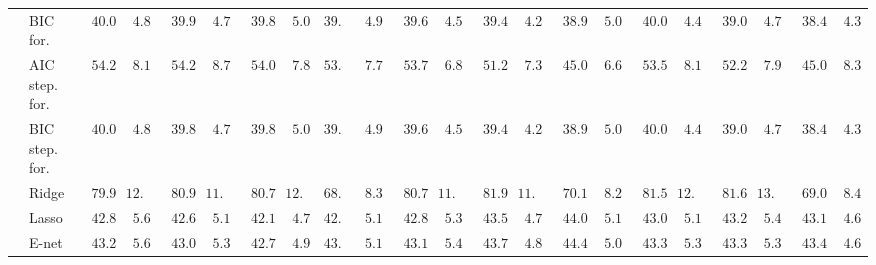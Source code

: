 \begin{tabular}{llllllllllllllllllllll}
	& BIC for.  & $\phantom{0}40.046$ & $\phantom{0}4.891$ & $\phantom{0}39.903$ & $\phantom{0}4.745$ & $\phantom{0}39.851$ & $\phantom{0}5.058$ & $39.678$ & $\phantom{0}4.918$ & $\phantom{0}39.620$ & $\phantom{0}4.530$ & $\phantom{0}39.457$ & $\phantom{0}4.230$ & $\phantom{0}38.935$ & $\phantom{0}5.059$ & $\phantom{0}40.050$ & $\phantom{0}4.482$ & $\phantom{0}39.016$ & $\phantom{0}4.798$ & $\phantom{0}38.473$ & $\phantom{0}4.378$ \\
	& AIC step. for.  & $\phantom{0}54.259$ & $\phantom{0}8.172$ & $\phantom{0}54.213$ & $\phantom{0}8.766$ & $\phantom{0}54.067$ & $\phantom{0}7.897$ & $53.360$ & $\phantom{0}7.769$ & $\phantom{0}53.740$ & $\phantom{0}6.857$ & $\phantom{0}51.263$ & $\phantom{0}7.309$ & $\phantom{0}45.025$ & $\phantom{0}6.651$ & $\phantom{0}53.545$ & $\phantom{0}8.129$ & $\phantom{0}52.284$ & $\phantom{0}7.974$ & $\phantom{0}45.033$ & $\phantom{0}8.324$ \\
	& BIC step. for.  & $\phantom{0}40.004$ & $\phantom{0}4.832$ & $\phantom{0}39.897$ & $\phantom{0}4.739$ & $\phantom{0}39.846$ & $\phantom{0}5.052$ & $39.693$ & $\phantom{0}4.921$ & $\phantom{0}39.632$ & $\phantom{0}4.531$ & $\phantom{0}39.480$ & $\phantom{0}4.244$ & $\phantom{0}38.935$ & $\phantom{0}5.059$ & $\phantom{0}40.011$ & $\phantom{0}4.482$ & $\phantom{0}39.044$ & $\phantom{0}4.786$ & $\phantom{0}38.473$ & $\phantom{0}4.378$ \\
	& Ridge  & $\phantom{0}79.983$ & $12.128$ & $\phantom{0}80.955$ & $11.019$ & $\phantom{0}80.723$ & $12.394$ & $68.071$ & $\phantom{0}8.351$ & $\phantom{0}80.756$ & $11.515$ & $\phantom{0}81.929$ & $11.470$ & $\phantom{0}70.120$ & $\phantom{0}8.298$ & $\phantom{0}81.584$ & $12.806$ & $\phantom{0}81.650$ & $13.138$ & $\phantom{0}69.032$ & $\phantom{0}8.494$ \\
	& Lasso  & $\phantom{0}42.892$ & $\phantom{0}5.658$ & $\phantom{0}42.631$ & $\phantom{0}5.117$ & $\phantom{0}42.199$ & $\phantom{0}4.775$ & $42.953$ & $\phantom{0}5.152$ & $\phantom{0}42.889$ & $\phantom{0}5.348$ & $\phantom{0}43.538$ & $\phantom{0}4.763$ & $\phantom{0}44.041$ & $\phantom{0}5.140$ & $\phantom{0}43.006$ & $\phantom{0}5.138$ & $\phantom{0}43.217$ & $\phantom{0}5.470$ & $\phantom{0}43.190$ & $\phantom{0}4.641$ \\
	& E-net  & $\phantom{0}43.243$ & $\phantom{0}5.669$ & $\phantom{0}43.023$ & $\phantom{0}5.362$ & $\phantom{0}42.708$ & $\phantom{0}4.996$ & $43.109$ & $\phantom{0}5.168$ & $\phantom{0}43.198$ & $\phantom{0}5.440$ & $\phantom{0}43.771$ & $\phantom{0}4.834$ & $\phantom{0}44.474$ & $\phantom{0}5.055$ & $\phantom{0}43.393$ & $\phantom{0}5.315$ & $\phantom{0}43.312$ & $\phantom{0}5.306$ & $\phantom{0}43.435$ & $\phantom{0}4.673$ \\

\end{tabular}
